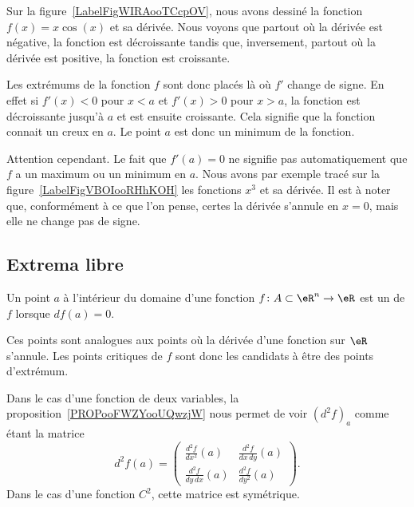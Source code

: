 Sur la figure~\ref{LabelFigWIRAooTCcpOV}, nous avons dessiné la fonction $f(x)=x\cos(x)$ et sa dérivée. Nous voyons que partout où la dérivée est négative, la fonction est décroissante tandis que, inversement, partout où la dérivée est positive, la fonction est croissante.
\newcommand{\CaptionFigWIRAooTCcpOV}{La fonction $f(x)=x\cos(x)$ en bleu et sa dérivée en rouge.}


Les extrémums de la fonction \( f\) sont donc placés là où \( f'\) change de signe. En effet si \( f'(x)<0\) pour \( x<a\) et \( f'(x)>0\) pour \( x>a\), la fonction est décroissante jusqu'à \( a\) et est ensuite croissante. Cela signifie que la fonction connait un creux en \( a\). Le point \( a\) est donc un minimum de la fonction.

Attention cependant. Le fait que \( f'(a)=0\) ne signifie pas automatiquement que \( f\) a un maximum ou un minimum en \( a\). Nous avons par exemple tracé sur la figure~\ref{LabelFigVBOIooRHhKOH} les fonctions \( x^3\) et sa dérivée. Il est à noter que, conformément à ce que l'on pense, certes la dérivée s'annule en \( x=0\), mais elle ne change pas de signe.

\newcommand{\CaptionFigVBOIooRHhKOH}{La dérivée de $x^3$ s'annule en $x=0$, mais ce n'est ni un minimum ni un maximum.}


\subsection{Extrema libre}

\begin{definition}      \label{DEFooYJLZooLkEAYf}
    Un point \( a\) à l'intérieur du domaine d'une fonction \( f\colon A\subset\eR^n\to \eR\) est un  de \( f\) lorsque \( df(a)=0\).
\end{definition}

Ces points sont analogues aux points où la dérivée d'une fonction sur \( \eR\) s'annule. Les points critiques de \( f\) sont donc les candidats à être des points d'extrémum.

Dans le cas d'une fonction de deux variables, la proposition~\ref{PROPooFWZYooUQwzjW} nous permet de voir \( (d^2f)_a\) comme étant la matrice
\begin{equation}
    d^2f(a)=\begin{pmatrix}
        \frac{ d^2f  }{ dx^2 }(a)   & \frac{ d^2f  }{ dx\,dy }(a)     \\
        \frac{ d^2f  }{ dy\,dx }(a) & \frac{ d^2f  }{ dy^2 }(a)
    \end{pmatrix}.
\end{equation}
Dans le cas d'une fonction \( C^2\), cette matrice est symétrique.

